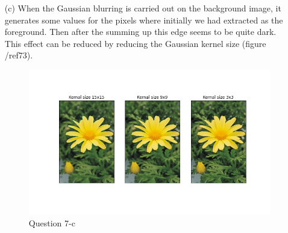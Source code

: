 \documentclass[11pt]{article}
\begin{document}
\begin{itemize}
    \item[(c)] When the Gaussian blurring is carried out on the background image, it generates some values for the pixels where initially we had
    extracted as the foreground. Then after the summing up this edge seems to be quite dark. This effect can be reduced by reducing the Gaussian 
    kernel size (figure /ref{73}).

    \begin{figure}[!h]
        \centering
        \includegraphics[width=\textwidth]{Images/73.jpg}
        \caption{Question 7-c}
        \label{73}
    \end{figure}
     
\end{itemize} 
    
\newpage


\end{document}
